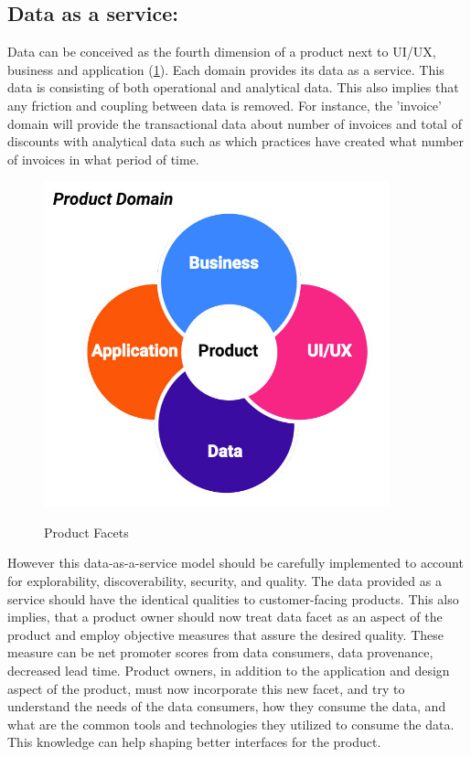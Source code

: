 \documentclass[review]{elsarticle}
\begin{document}
\subsection{Data as a service:}

Data can be conceived as the fourth dimension of a product next to UI/UX, business and application (\ref{data-facets}). Each domain provides its data as a service. This data is consisting of both operational and analytical data. This also implies that any friction and coupling between data is removed. For instance, the 'invoice' domain will provide the transactional data about number of invoices and total of discounts with analytical data such as which practices have created what number of invoices in what period of time.

\begin{figure}[h!]
    \centering
    \includegraphics[width=10cm]{Media/product-facets.jpg}
    \label{data-facets}
    \caption{Product Facets}
\end{figure}

However this data-as-a-service model should be carefully implemented to account for explorability, discoverability, security, and quality. The data provided as a service should have the identical qualities to customer-facing products. This also implies, that a product owner should now treat data facet as an aspect of the product and employ objective measures that assure the desired quality. These measure can be net promoter scores from data consumers, data provenance, decreased lead time. Product owners, in addition to the application and design aspect of the product, must now incorporate this new facet, and try to understand the needs of the data consumers, how they consume the data, and what are the common tools and technologies they utilized to consume the data. This knowledge can help shaping better interfaces for the product.
\end{document}
